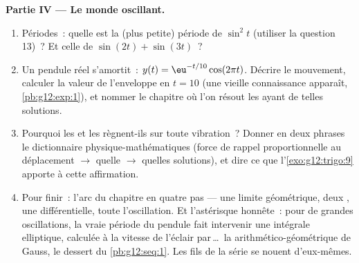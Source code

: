 \begin{problem}
\medskip
\noindent\textbf{Partie IV --- Le monde oscillant.}
\begin{enumerate}[resume]
  \item Périodes~: quelle est la (plus petite) période de
        $\sin^2 t$ (utiliser la question 13)~? Et celle de
        $\sin(2t) + \sin(3t)$~?
  \item Un pendule réel s'amortit~:
        $y(t) = \eu^{-t/10}\cos(2\pi t)$. Décrire le mouvement,
        calculer la valeur de l'enveloppe en $t = 10$ (une vieille
        connaissance apparaît, \cref{pb:g12:exp:1}), et nommer le
        chapitre où l'on résout les  ayant de telles
        solutions.
  \item Pourquoi les  et les  règnent-ils sur toute
        vibration~? Donner en deux phrases le dictionnaire
        physique-mathématiques (force de rappel proportionnelle au
        déplacement $\rightarrow$ quelle  $\rightarrow$
        quelles solutions), et dire ce que
        l'\cref{exo:g12:trigo:9} apporte à cette affirmation.
  \item Pour finir~: l'arc du chapitre en quatre pas --- une limite
        géométrique, deux , une  différentielle,
        toute l'oscillation. Et l'astérisque honnête~: pour de
        grandes oscillations, la vraie période du pendule fait
        intervenir une intégrale elliptique, calculée à la vitesse
        de l'éclair par\,\dots\ la  arithmético-géométrique
        de Gauss, le dessert du \cref{pb:g12:seq:1}. Les fils de la
        série se nouent d'eux-mêmes.
\end{enumerate}
\end{problem}
